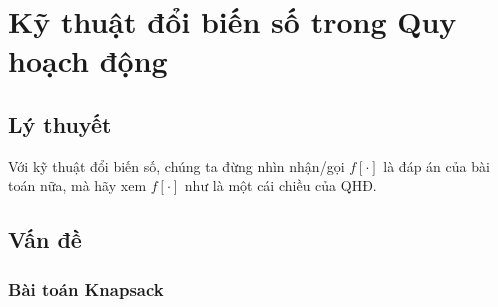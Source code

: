 \chapter{Kỹ thuật đổi biến số trong Quy hoạch động}

\minitoc

\section{Lý thuyết}

Với kỹ thuật đổi biến số, chúng ta đừng nhìn nhận/gọi $f[\cdot]$ là đáp án của bài toán nữa, mà hãy xem $f[\cdot]$ như là một cái chiều của QHĐ.

\section{Vấn đề}

\subsection{Bài toán Knapsack}

